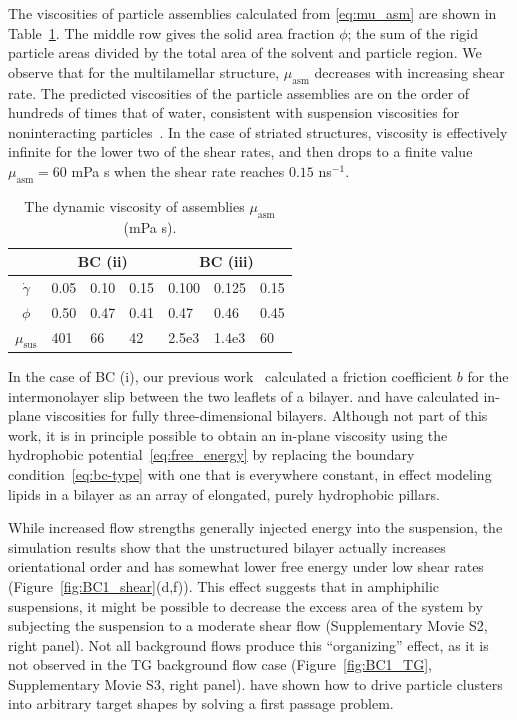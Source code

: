 \documentclass[prb,preprint,showpacs,preprintnumbers,amsmath,amssymb,longbibliography]{revtex4-1}
\begin{document}


The viscosities of particle assemblies calculated from \eqref{eq:mu_asm} are shown in
Table~\ref{tbl:bcii_visc}. The middle row gives the solid area fraction
$\phi$; the sum of the rigid particle areas divided by the total area of
the solvent and particle region. We observe that for the multilamellar
structure, $\mu_{\text{asm}}$ decreases with increasing shear rate. The
predicted viscosities of the particle assemblies are on the order of
hundreds of times that of water, consistent with suspension viscosities
for noninteracting particles~\cite{KONIJN201461}. In the case of
striated structures, viscosity is effectively infinite for the lower two
of the shear rates, and then drops to a finite value $\mu_{\text{asm}} =
60$ mPa s when the shear rate reaches $0.15$ ns$^{-1}$.
\begin{table}
  \caption{\label{tbl:bcii_visc} The dynamic viscosity of assemblies
  $\mu_{\text{asm}}$ (mPa s).}
\centering
\begin{tabularx}{0.7\textwidth}{c|X|X|X||X|X|X}
&\multicolumn{3}{c||}{BC (ii)} & \multicolumn{3}{c}{BC (iii)}\\
\hline
  $\dot \gamma$ & 0.05 & 0.10 \quad & 0.15 & 0.100 & 0.125 & 0.15\\
  \hline
  $\phi$ & 0.50 & 0.47 & 0.41 & 0.47 & 0.46 & 0.45 \\
  \hline
  $\mu_{\text{sus}} $ & 401 & 66 & 42 & 2.5e3 & 1.4e3 & 60\\
\hline
\end{tabularx}
\end{table}

In the case of BC (i), our previous work~\cite{Fu2022_JFM} calculated a
friction coefficient $b$ for the intermonolayer slip between the two
leaflets of a bilayer. \citet{denOtter2007,Zgorski2019} and
\citet{doi:10.1073/pnas.2100156118} have calculated in-plane viscosities
for fully three-dimensional bilayers. Although not part of this work, it
is in principle possible to obtain an in-plane viscosity using the
hydrophobic potential~\eqref{eq:free_energy} by replacing the boundary
condition~\eqref{eq:bc-type} with one that is everywhere constant, in
effect modeling lipids in a bilayer as an array of elongated, purely
hydrophobic pillars. 

While increased flow strengths generally injected energy into the
suspension, the simulation results show that the unstructured bilayer
actually increases orientational order and has somewhat lower free
energy under low shear rates (Figure~\ref{fig:BC1_shear}(d,f)). This
effect suggests that in amphiphilic suspensions, it might be possible to
decrease the excess area of the system by subjecting the suspension to a
moderate shear flow (Supplementary Movie S2, right panel).
Not all background flows produce this
``organizing'' effect, as it is not observed in the TG background flow
case (Figure~\ref{fig:BC1_TG}, Supplementary Movie S3, right panel).
\citet{PhysRevLett.128.256102} have
shown how to drive particle clusters into arbitrary target shapes by
solving a first passage problem.
\end{document}
